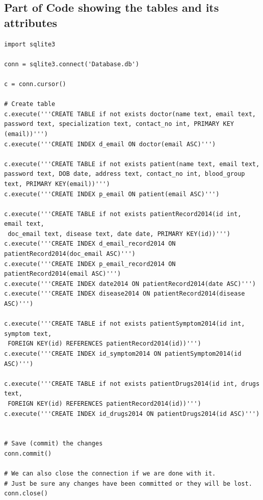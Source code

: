 \documentclass{article}
\begin{document}
\subsection{Part of Code showing the tables and its attributes}
\begin{lstlisting}
import sqlite3

conn = sqlite3.connect('Database.db')

c = conn.cursor()

# Create table
c.execute('''CREATE TABLE if not exists doctor(name text, email text, 
password text, specialization text, contact_no int, PRIMARY KEY (email))''')
c.execute('''CREATE INDEX d_email ON doctor(email ASC)''')

c.execute('''CREATE TABLE if not exists patient(name text, email text, 
password text, DOB date, address text, contact_no int, blood_group text, PRIMARY KEY(email))''')
c.execute('''CREATE INDEX p_email ON patient(email ASC)''')

c.execute('''CREATE TABLE if not exists patientRecord2014(id int, email text,
 doc_email text, disease text, date date, PRIMARY KEY(id))''')
c.execute('''CREATE INDEX d_email_record2014 ON patientRecord2014(doc_email ASC)''')
c.execute('''CREATE INDEX p_email_record2014 ON patientRecord2014(email ASC)''')
c.execute('''CREATE INDEX date2014 ON patientRecord2014(date ASC)''')
c.execute('''CREATE INDEX disease2014 ON patientRecord2014(disease ASC)''')

c.execute('''CREATE TABLE if not exists patientSymptom2014(id int, symptom text,
 FOREIGN KEY(id) REFERENCES patientRecord2014(id))''')
c.execute('''CREATE INDEX id_symptom2014 ON patientSymptom2014(id ASC)''')

c.execute('''CREATE TABLE if not exists patientDrugs2014(id int, drugs text,
 FOREIGN KEY(id) REFERENCES patientRecord2014(id))''')
c.execute('''CREATE INDEX id_drugs2014 ON patientDrugs2014(id ASC)''')


# Save (commit) the changes
conn.commit()

# We can also close the connection if we are done with it.
# Just be sure any changes have been committed or they will be lost.
conn.close()


\end{lstlisting}
\end{document}
